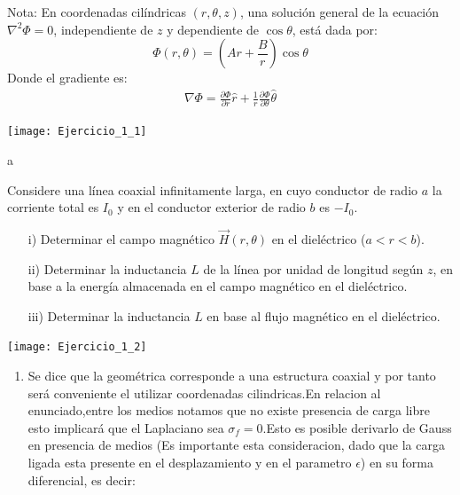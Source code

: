 \documentclass[
  11pt,
  letterpaper,
   addpoints,
  ]{exam}
\begin{document}
\begin{questions}
Nota: En coordenadas cilíndricas \( (r, \theta, z) \), una solución general de la ecuación \( \nabla^2 \Phi = 0 \), independiente de \( z \) y dependiente de \( \cos\theta \), está dada por:
\begin{equation}
    \Phi (r, \theta) = (Ar + \frac{B}{r}) \cos\theta
\end{equation}
Donde el gradiente es:
\begin{align}
    \nabla \Phi = \frac{\partial \Phi}{\partial r} \hat{r} + \frac{1}{r} \frac{\partial \Phi}{\partial \theta} \hat{\theta}
\end{align}
\begin{center}
    \texttt{[image: Ejercicio\_1\_1]}
\end{center}
    \begin{solution}
        a
    \end{solution}
    \newpage
    \question  
    Considere una línea coaxial infinitamente larga, en cuyo conductor de radio \( a \) la corriente total es \( I_0 \) y en el conductor exterior de radio \( b \) es \( -I_0 \).
    \begin{itemize}
        \item[i)] Determinar el campo magnético \( \vec{H} (r,\theta) \) en el dieléctrico (\( a < r < b \)).
        \item[ii)] Determinar la inductancia \( L \) de la línea por unidad de longitud según \( z \), en base a la energía almacenada en el campo magnético en el dieléctrico.
        \item[iii)] Determinar la inductancia \( L \) en base al flujo magnético en el dieléctrico.
    \end{itemize}
    \begin{center}
        \texttt{[image: Ejercicio\_1\_2]}
    \end{center}
    \begin{solution}
        \begin{enumerate}
            \item Se dice que la geométrica corresponde a una estructura coaxial y por tanto será conveniente el utilizar coordenadas cilindricas.En relacion al enunciado,entre los medios notamos que no existe presencia de carga libre esto implicará que el Laplaciano sea $\sigma_f = 0$.Esto es posible derivarlo de Gauss en presencia de medios (Es importante esta consideracion, dado que la carga ligada esta presente en el desplazamiento y en el parametro $\epsilon$) en su forma  diferencial, es decir:

\end{enumerate}
\end{solution}
\end{questions}
\end{document}
